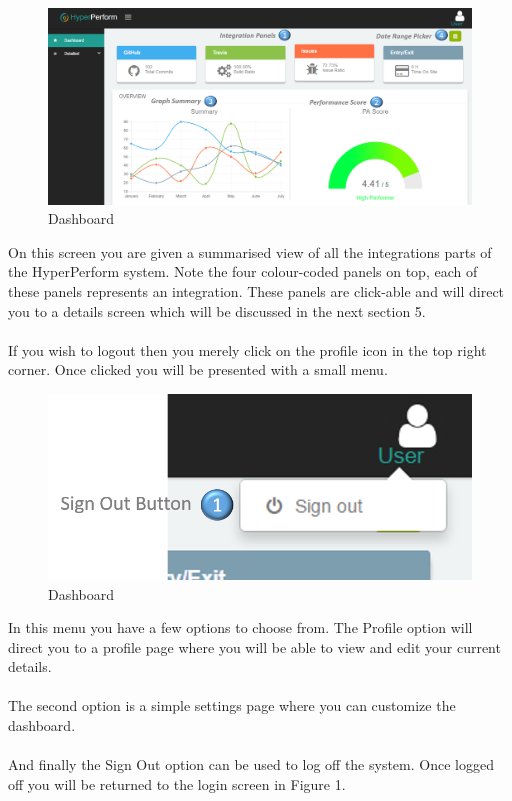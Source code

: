 \documentclass[11pt,a4paper]{article}
\begin{document}
\begin{figure}[H]
	\begin{center}
		\includegraphics[scale=0.27]{../Images/Getting_Started/dash_numbered.png}
		\caption{Dashboard}
	\end{center}
\end{figure}
\noindent
On this screen you are given a summarised view of all the integrations parts of the HyperPerform system. Note the four colour-coded panels on top, each of these panels represents an integration. These panels are click-able and will direct you to a details screen which will be discussed in the next section 5. \\ \\
If you wish to logout then you merely click on the profile icon in the top right corner. Once clicked you will be presented with a small menu. 

\begin{figure}[H]
	\begin{center}
		\includegraphics[scale=0.7]{../Images/Getting_Started/logout_numbered}
		\caption{Dashboard}
	\end{center}
\end{figure}
\noindent
In this menu you have a few options to choose from. The Profile option will direct you to a profile page where you will be able to view and edit your current details. \\ \\
The second option is a simple settings page where you can customize the dashboard.\\ \\
And finally the Sign Out option can be used to log off the system. Once logged off you will be returned to the login screen in Figure 1.
\end{document}
